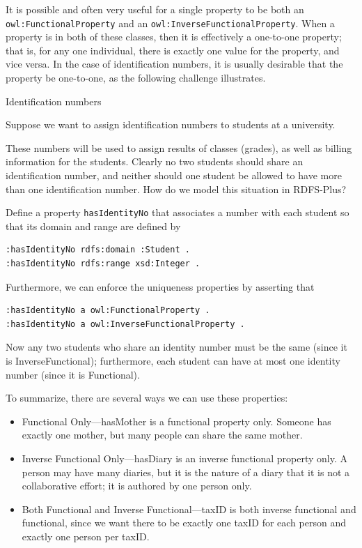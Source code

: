 It is possible and often very useful for a single property to be both an
\texttt{owl:FunctionalProperty} and an \texttt{owl:InverseFunctionalProperty}. When a
property is in both of these classes, then it is effectively a
one-to-one property; that is, for any one individual, there is exactly
one value for the property, and vice versa. In the case of
identification numbers, it is usually desirable that the property be
one-to-one, as the following challenge illustrates.

\begin{challenge}{Identification numbers}

Suppose we want to assign identification numbers to students at a
university.

These numbers will be used to assign results of classes (grades), as
well as billing information for the students. Clearly no two students
should share an identification number, and neither should one student be
allowed to have more than one identification number. How do we model
this situation in RDFS-Plus?

\solution

Define a property \texttt{hasIdentityNo} that associates a number with each
student so that its domain and range are defined by

\begin{lstlisting}
:hasIdentityNo rdfs:domain :Student .
:hasIdentityNo rdfs:range xsd:Integer .
\end{lstlisting}

Furthermore, we can enforce the uniqueness properties by asserting that

\begin{lstlisting}
:hasIdentityNo a owl:FunctionalProperty .
:hasIdentityNo a owl:InverseFunctionalProperty .
\end{lstlisting}

Now any two students who share an identity number must be the same
(since it is InverseFunctional);
furthermore, each student can have at most one identity number (since it
is Functional).
\end{challenge}

To summarize, there are several ways we can use these properties:

\begin{itemize}
\item Functional Only---hasMother is a functional property only. Someone has
exactly one mother, but many people can share the same mother.

\item Inverse Functional Only---hasDiary is an inverse functional property
only. A person may have many diaries, but it is the nature of a diary
that it is not a collaborative effort; it is authored by one person
only.

\item Both Functional and Inverse Functional---taxID is both inverse
functional and functional, since we want there to be exactly one taxID
for each person and exactly one person per taxID.
\end{itemize}



